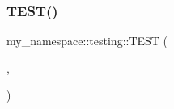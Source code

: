\mbox{\label{namespacemy__namespace_1_1testing_aa568f6a68b9e42841f6da570ef62b623}} 
\subsubsection{\texorpdfstring{TEST()}{TEST()}\hspace{0.1cm}{\footnotesize\ttfamily [2/2]}}
{\footnotesize\ttfamily my\+\_\+namespace\+::testing\+::\+T\+E\+ST (\begin{DoxyParamCaption}\item[{Nested\+Testing\+Namespace\+Test}]{,  }\item[{Failure}]{ }\end{DoxyParamCaption})}

